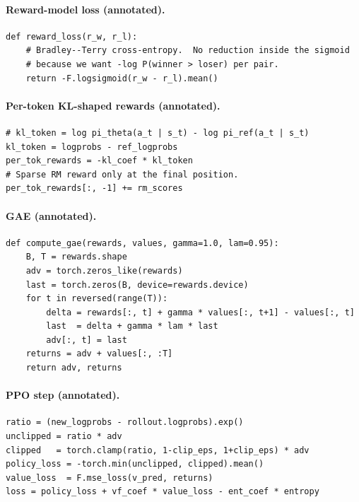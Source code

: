 \documentclass[11pt,oneside]{scrbook}
\begin{document}
\paragraph{Reward-model loss (annotated).}
\begin{codebox}
\begin{verbatim}
def reward_loss(r_w, r_l):
    # Bradley--Terry cross-entropy.  No reduction inside the sigmoid
    # because we want -log P(winner > loser) per pair.
    return -F.logsigmoid(r_w - r_l).mean()
\end{verbatim}
\end{codebox}

\paragraph{Per-token KL-shaped rewards (annotated).}
\begin{codebox}
\begin{verbatim}
# kl_token = log pi_theta(a_t | s_t) - log pi_ref(a_t | s_t)
kl_token = logprobs - ref_logprobs
per_tok_rewards = -kl_coef * kl_token
# Sparse RM reward only at the final position.
per_tok_rewards[:, -1] += rm_scores
\end{verbatim}
\end{codebox}

\paragraph{GAE (annotated).}
\begin{codebox}
\begin{verbatim}
def compute_gae(rewards, values, gamma=1.0, lam=0.95):
    B, T = rewards.shape
    adv = torch.zeros_like(rewards)
    last = torch.zeros(B, device=rewards.device)
    for t in reversed(range(T)):
        delta = rewards[:, t] + gamma * values[:, t+1] - values[:, t]
        last  = delta + gamma * lam * last
        adv[:, t] = last
    returns = adv + values[:, :T]
    return adv, returns
\end{verbatim}
\end{codebox}

\paragraph{PPO step (annotated).}
\begin{codebox}
\begin{verbatim}
ratio = (new_logprobs - rollout.logprobs).exp()
unclipped = ratio * adv
clipped   = torch.clamp(ratio, 1-clip_eps, 1+clip_eps) * adv
policy_loss = -torch.min(unclipped, clipped).mean()
value_loss  = F.mse_loss(v_pred, returns)
loss = policy_loss + vf_coef * value_loss - ent_coef * entropy
\end{verbatim}
\end{codebox}
\end{document}
